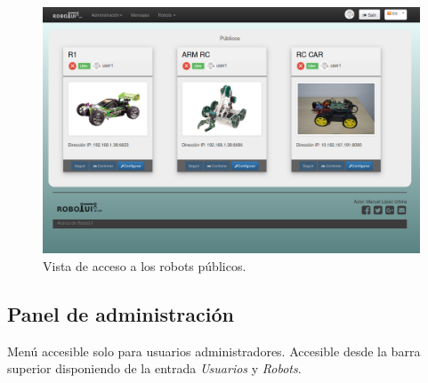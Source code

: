 \begin{figure}[H]
  \begin{center}
    \includegraphics[scale=.35]{imagenes/manual-usuario/robots-publicos.png}
  \end{center}
  \caption{ Vista de acceso a los robots públicos.}
  \label{website:pagina-principal}
\end{figure}




\subsection{Panel de administración}


Menú accesible solo para usuarios administradores. Accesible desde la barra superior disponiendo de la entrada \emph{Usuarios} y \emph{Robots}.

